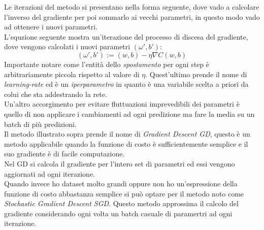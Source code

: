 \documentclass[12pt,a4paper,openright,twoside]{report}
\begin{document}

Le iterazioni del metodo si presentano nella forma seguente, dove vado a calcolare l'inverso del gradiente per poi sommarlo ai vecchi parametri, in questo modo vado ad ottenere i nuovi parametri. \\
L'equzione seguente mostra un'iterazione del processo di discesa del gradiente, dove vengono calcolati i nuovi parametri $(\omega', b')$:
\begin{equation}
    (\omega', b') := (w,b)-\eta \nabla C(w,b)
\end{equation}
Importante notare come l'entità dello \emph{spostamento} per ogni step è arbitrariamente piccola rispetto al valore di $\eta$. Quest'ultimo prende il nome di \emph{learning-rate} ed è un \emph{iperparametro} in quanto è una variabile scelta a priori da colui che sta addestrando la rete. \\
Un'altro accorgimento per evitare fluttuazioni imprevedibili dei parametri è quello di non applicare i cambiamenti ad ogni predizione ma fare la media su un batch di più predizioni. \\
Il metodo illustrato sopra prende il nome di \emph{Gradient Descent GD}, questo è un metodo applicabile quando la funzione di costo è sufficientemente semplice e il suo gradiente è di facile computazione.\\
Nel GD si calcola il gradiente per l'intero set di parametri ed essi vengono aggiornati ad ogni iterazione. \\
Quando invece ho dataset molto grandi oppure non ho un'espressione della funzione di costo abbastanza semplice si può optare per il metodo noto come \emph{Stochastic Gradient Descent SGD}.
Questo metodo approssima il calcolo del gradiente considerando ogni volta un batch casuale di paramertri ad ogni iterazione.
\end{document}
